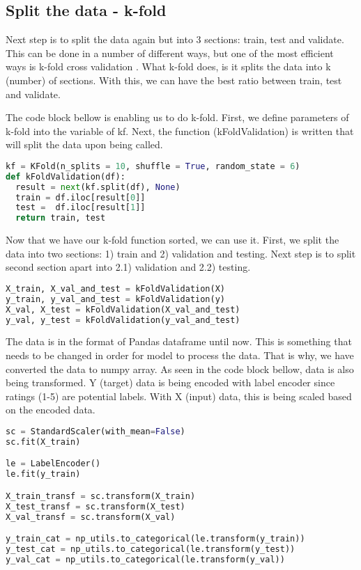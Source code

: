 \subsection{Split the data - k-fold}
Next step is to split the data again but into 3 sections: train, test and validate. This can be done in a number of different ways, but one of the most efficient ways is k-fold cross validation \parencite{rodriguez2009sensitivity}.
What k-fold does, is it splits the data into k (number) of sections. With this, we can have the best ratio between train, test and validate.

The code block bellow is enabling us to do k-fold. First, we define parameters of k-fold into the variable of kf. Next, the function (kFoldValidation) is written that will split the data upon being called.
\begin{lstlisting}[language=Python, caption=Create k-fold function]
kf = KFold(n_splits = 10, shuffle = True, random_state = 6)
def kFoldValidation(df):
  result = next(kf.split(df), None)
  train = df.iloc[result[0]]
  test =  df.iloc[result[1]]
  return train, test
\end{lstlisting}
Now that we have our k-fold function sorted, we can use it. First, we split the data into two sections: 1) train and 2) validation and testing. Next step is to split second section apart into 2.1) validation and 2.2) testing. %
\begin{lstlisting}[language=Python, caption={Split the data to train, test and validate}]
X_train, X_val_and_test = kFoldValidation(X)
y_train, y_val_and_test = kFoldValidation(y)
X_val, X_test = kFoldValidation(X_val_and_test)
y_val, y_test = kFoldValidation(y_val_and_test)
\end{lstlisting}
The data is in the format of Pandas dataframe until now. This is something that needs to be changed in order for model to process the data. That is why, we have converted the data to numpy array. 
As seen in the code block bellow, data is also being transformed. Y (target) data is being encoded with label encoder since ratings (1-5) are potential labels. With X (input) data, this is being scaled based on the encoded data.
\begin{lstlisting}[language=Python, caption={Reshape the data to fit the model}]
sc = StandardScaler(with_mean=False)
sc.fit(X_train)

le = LabelEncoder()
le.fit(y_train)

X_train_transf = sc.transform(X_train)
X_test_transf = sc.transform(X_test)
X_val_transf = sc.transform(X_val)

y_train_cat = np_utils.to_categorical(le.transform(y_train))
y_test_cat = np_utils.to_categorical(le.transform(y_test))
y_val_cat = np_utils.to_categorical(le.transform(y_val))
\end{lstlisting}